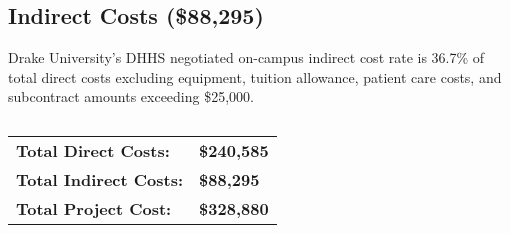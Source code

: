 \documentclass[11pt]{article}
\begin{document}
	\subsection*{Indirect Costs (\$88,295)}
	Drake University's DHHS negotiated on-campus indirect cost rate is 36.7\% of total direct costs excluding equipment, tuition allowance, patient care costs, and subcontract amounts exceeding \$25,000.


	\subsection*{}

\begin{tabular}{ll}
	{\large \bf Total Direct Costs:} & {\large \bf \$240,585 }\\
	{\large \bf Total Indirect Costs:} & {\large \bf \$88,295}\\
	{\large \bf Total Project Cost:} & {\large \bf \$328,880}
\end{tabular}
\end{document}
